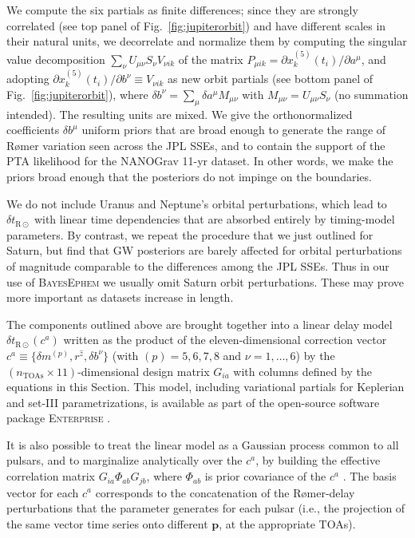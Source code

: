 \documentclass[iop,apj,twocolappendix]{emulateapj}
\begin{document}
\begin{itemize}
We compute the six partials as finite differences; since they are strongly correlated (see top panel of Fig.\ \ref{fig:jupiterorbit}) and have different scales in their natural units, we decorrelate and normalize them by computing the singular value decomposition $\sum_\nu U_{\mu\nu} S_\nu V_{\nu i k}$ of the matrix $P_{\mu i k} = \partial x^{(5)}_k(t_i)/\partial a^\mu$, and adopting $\partial x^{(5)}_k(t_i)/\partial b^\nu \equiv V_{\nu i k}$ as new orbit partials (see bottom panel of Fig.\ \ref{fig:jupiterorbit}), where $\delta b^\nu = \sum_\mu \delta a^\mu M_{\mu \nu}$ with $M_{\mu \nu} = U_{\mu\nu} S_\nu$ (no summation intended). The resulting units are mixed. We give the orthonormalized coefficients $\delta b^\mu$ uniform priors that are broad enough to generate the range of R{\o}mer variation seen across the JPL SSEs, and to contain the support of the PTA likelihood for the NANOGrav 11-yr dataset. In other words, we make the priors broad enough that the posteriors do not impinge on the boundaries.

We do not include Uranus and Neptune's orbital perturbations, which lead to $\delta t_{\mathrm{R\odot}}$ with linear time dependencies that are absorbed entirely by timing-model parameters. By contrast, we repeat the procedure that we just outlined for Saturn, but find that GW posteriors are barely affected for orbital perturbations of magnitude comparable to the differences among the JPL SSEs. Thus in our use of \textsc{BayesEphem} we usually omit Saturn orbit perturbations. These may prove more important as datasets increase in length.
\end{itemize}

The components outlined above are brought together into a linear delay model $\delta t_{\mathrm{R}\odot}(c^a)$ written as the product of the eleven-dimensional correction vector $c^a \equiv \{\delta m^{(p)}, r^{\hat{z}}, \delta b^\nu\}$ (with $(p) = 5,6,7,8$ and $\nu = 1, \ldots, 6$) by the $(n_\mathrm{TOAs} \times 11)$-dimensional design matrix $G_{i a}$ with columns defined by the equations in this Section. This model, including variational partials for Keplerian and set-III parametrizations, is available as part of the open-source software package \textsc{Enterprise} \citep{enterprise}.

It is also possible to treat the linear model as a Gaussian process common to all pulsars, and to marginalize analytically over the $c^a$, by building the effective correlation matrix $G_{i a} \Phi_{ab} G_{j b}$, where $\Phi_{ab}$ is prior covariance of the $c^a$ \citep{vhv14}. The basis vector for each $c^a$ corresponds to the concatenation of the R{\o}mer-delay perturbations that the parameter generates for each pulsar (i.e., the projection of the same vector time series onto different $\mathbf{p}$, at the appropriate TOAs).
\end{document}
